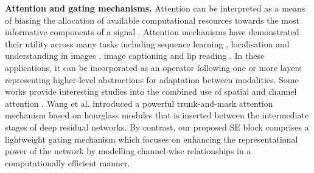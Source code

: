 \vspace{5pt}
\noindent\textbf{Attention and gating mechanisms.}  Attention can be interpreted as a means of biasing the allocation of available computational resources towards the most informative components of a signal \cite{olshausen_1993, itti_1998model, itti_2001, larochelle_nips2010, mnih_nips2014, vaswani_nips2017}.  Attention mechanisms have demonstrated their utility across many tasks including sequence learning \cite{bluche_nips2016text, miech_2017contextgate}, localisation and understanding in images \cite{cao_iccv2015twice, max_nips2015stn}, image captioning \cite{xu_icml2015, chen_cvpr2017sca} and lip reading \cite{chung_cvpr2017lip}. In these applications, it can  be incorporated as an operator following one or more layers representing higher-level abstractions for adaptation between modalities.   Some works provide interesting studies into the combined use of spatial and channel attention \cite{wangfei_cvpr2017resattent, woo_eccv2018cbam}. Wang et al. \cite{wangfei_cvpr2017resattent} introduced a powerful trunk-and-mask attention mechanism based on hourglass modules \cite{newell_eccv2016hourglass} that is inserted between the intermediate stages of deep residual networks. By contrast, our proposed SE block comprises a lightweight gating mechanism which focuses on enhancing the representational power of the network by modelling channel-wise relationships in a computationally efficient manner.
